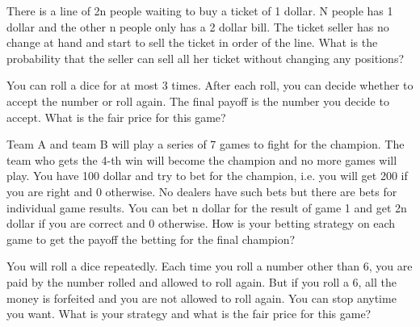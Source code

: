 \begin{exe}
There is a line of 2n people waiting to buy a ticket of 1 dollar. N people has 1 dollar and the other n people only has a 2 dollar bill. The ticket seller has no change at hand and start to sell the ticket in order of the line. What is the probability that the seller can sell all her ticket without changing any positions?
\end{exe}
\begin{teacher}
\begin{sol}
\end{sol}
\end{teacher}

\begin{exe}
You can roll a dice for at most 3 times. After each roll, you can decide whether to accept the number or roll again. The final payoff is the number you decide to accept. What is the fair price for this game?
\end{exe}
\begin{teacher}
\begin{sol}
\end{sol}
\end{teacher}

\begin{exe}
Team A and team B will play a series of 7 games to fight for the champion. The team who gets the 4-th win will become the champion and no more games will play. You have 100 dollar and try to bet for the champion, i.e. you will get 200 if you are right and 0 otherwise. No dealers have such bets but there are bets for individual game results. You can bet n dollar for the result of game 1 and get 2n dollar if you are correct and 0 otherwise. How is your betting strategy on each game to get the payoff the betting for the final champion?  
\end{exe}
\begin{teacher}
\begin{sol}
\end{sol}
\end{teacher}

\begin{exe}
You will roll a dice repeatedly. Each time you roll a number other than 6, you are paid by the number rolled and allowed to roll again. But if you roll a 6, all the money is forfeited and you are not allowed to roll again. You can stop anytime you want. What is your strategy and what is the fair price for this game?
\end{exe}
\begin{teacher}
\begin{sol}
\end{sol}
\end{teacher}

